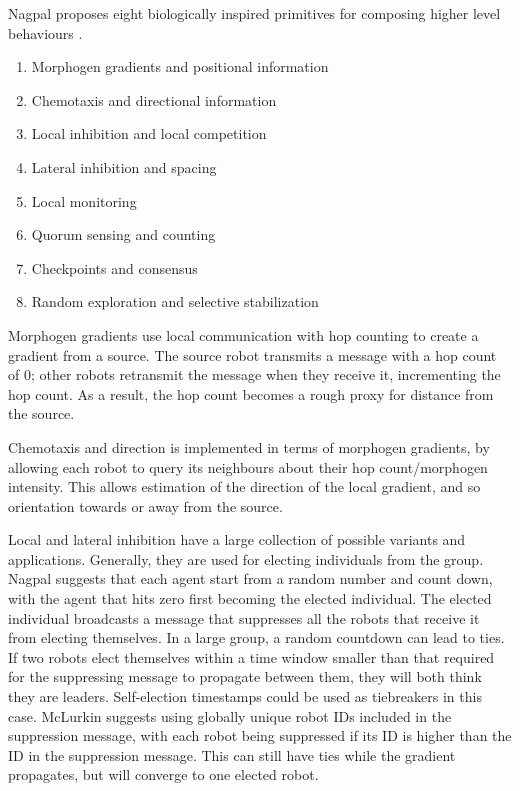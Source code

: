 \documentclass[]{article}
\begin{document}
Nagpal proposes eight biologically inspired primitives for composing higher level behaviours \cite{nagpal2004catalog}.
 
\begin{enumerate}[noitemsep]
\item Morphogen gradients and positional information
\item Chemotaxis and directional information
\item Local inhibition and local competition
\item Lateral inhibition and spacing
\item Local monitoring
\item Quorum sensing and counting
\item Checkpoints and consensus
\item Random exploration and selective stabilization
\end{enumerate}

Morphogen gradients use local communication with hop counting to create a gradient from a source. 
The source robot transmits a message with a hop count of 0; other robots retransmit the message when they receive it, incrementing the hop count. 
As a result, the hop count becomes a rough proxy for distance from the source. 

Chemotaxis and direction is implemented in terms of morphogen gradients, by allowing each robot to query its neighbours about their hop count/morphogen intensity. 
This allows estimation of the direction of the local gradient, and so orientation towards or away from the source. 

Local and lateral inhibition have a large collection of possible variants and applications. 
Generally, they are used for electing individuals from the group. 
Nagpal suggests that each agent start from a random number and count down, with the agent that hits zero first becoming the elected individual. 
The elected individual broadcasts a message that suppresses all the robots that receive it from electing themselves. 
In a large group, a random countdown can lead to ties.
If two robots elect themselves within a time window smaller than that required for the suppressing message to propagate between them, they will both think they are leaders.
Self-election timestamps could be used as tiebreakers in this case. 
McLurkin suggests using globally unique robot IDs included in the suppression message, with each robot being suppressed if its ID is higher than the ID in the suppression message.
This can still have ties while the gradient propagates, but will converge to one elected robot.
 
\end{document}
